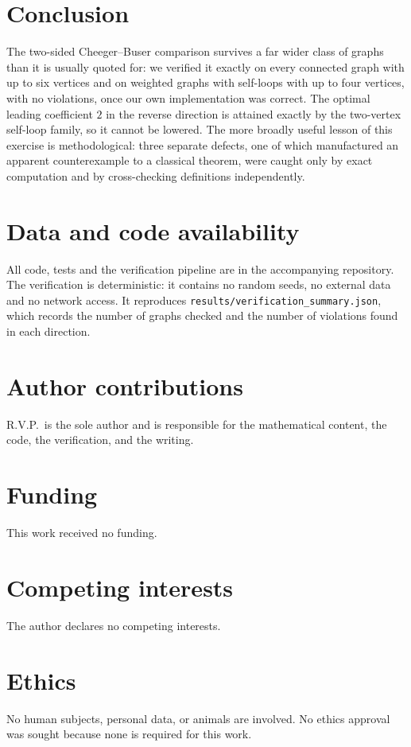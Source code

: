 \documentclass[11pt,a4paper]{article}
\theoremstyle{plain}
\theoremstyle{definition}
\begin{document}
\section{Conclusion}\label{sec:conclusion}

The two-sided Cheeger--Buser comparison survives a far wider class of graphs
than it is usually quoted for: we verified it exactly on every connected graph
with up to six vertices and on weighted graphs with self-loops with up to four
vertices, with no violations, once our own implementation was correct.  The
optimal leading coefficient $2$ in the reverse direction is attained exactly by
the two-vertex self-loop family, so it cannot be lowered.  The more broadly
useful lesson of this exercise is methodological: three separate defects, one of
which manufactured an apparent counterexample to a classical theorem, were
caught only by exact computation and by cross-checking definitions
independently.

\section*{Data and code availability}
All code, tests and the verification pipeline are in the accompanying
repository.  The verification is deterministic: it contains no random seeds, no
external data and no network access.  It reproduces
\texttt{results/verification\_summary.json}, which records the number of graphs
checked and the number of violations found in each direction.

\section*{Author contributions}
R.V.P.\ is the sole author and is responsible for the mathematical content, the
code, the verification, and the writing.

\section*{Funding}
This work received no funding.

\section*{Competing interests}
The author declares no competing interests.

\section*{Ethics}
No human subjects, personal data, or animals are involved.  No ethics approval
was sought because none is required for this work.
\end{document}
